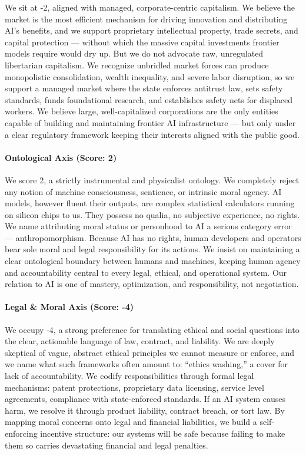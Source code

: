 We sit at -2, aligned with managed, corporate-centric capitalism. We
believe the market is the most efficient mechanism for driving
innovation and distributing AI's benefits, and we support proprietary
intellectual property, trade secrets, and capital protection --- without
which the massive capital investments frontier models require would dry
up. But we do not advocate raw, unregulated libertarian capitalism. We
recognize unbridled market forces can produce monopolistic
consolidation, wealth inequality, and severe labor disruption, so we
support a managed market where the state enforces antitrust law, sets
safety standards, funds foundational research, and establishes safety
nets for displaced workers. We believe large, well-capitalized
corporations are the only entities capable of building and maintaining
frontier AI infrastructure --- but only under a clear regulatory
framework keeping their interests aligned with the public good.

\paragraph{Ontological Axis (Score:
2)}\label{ontological-axis-score-2-1}

We score 2, a strictly instrumental and physicalist ontology. We
completely reject any notion of machine consciousness, sentience, or
intrinsic moral agency. AI models, however fluent their outputs, are
complex statistical calculators running on silicon chips to us. They
possess no qualia, no subjective experience, no rights. We name
attributing moral status or personhood to AI a serious category error
--- anthropomorphism. Because AI has no rights, human developers and
operators bear sole moral and legal responsibility for its actions. We
insist on maintaining a clear ontological boundary between humans and
machines, keeping human agency and accountability central to every
legal, ethical, and operational system. Our relation to AI is one of
mastery, optimization, and responsibility, not negotiation.

\paragraph{Legal \& Moral Axis (Score:
-4)}\label{legal-moral-axis-score--4-1}

We occupy -4, a strong preference for translating ethical and social
questions into the clear, actionable language of law, contract, and
liability. We are deeply skeptical of vague, abstract ethical principles
we cannot measure or enforce, and we name what such frameworks often
amount to: ``ethics washing,'' a cover for lack of accountability. We
codify responsibilities through formal legal mechanisms: patent
protections, proprietary data licensing, service level agreements,
compliance with state-enforced standards. If an AI system causes harm,
we resolve it through product liability, contract breach, or tort law.
By mapping moral concerns onto legal and financial liabilities, we build
a self-enforcing incentive structure: our systems will be safe because
failing to make them so carries devastating financial and legal
penalties.


